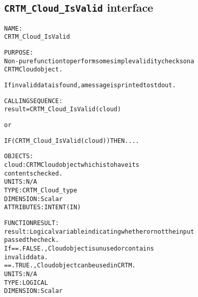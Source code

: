 \subsection{\texttt{CRTM\_Cloud\_IsValid} interface}
  \label{sec:CRTM_Cloud_IsValid_interface}
  \begin{alltt}
 
  NAME:
        CRTM_Cloud_IsValid
 
  PURPOSE:
        Non-pure function to perform some simple validity checks on a
        CRTM Cloud object.
 
        If invalid data is found, a message is printed to stdout.
 
  CALLING SEQUENCE:
        result = CRTM_Cloud_IsValid( cloud )
 
          or
 
        IF ( CRTM_Cloud_IsValid( cloud ) ) THEN....
 
  OBJECTS:
        cloud:         CRTM Cloud object which is to have its
                       contents checked.
                       UNITS:      N/A
                       TYPE:       CRTM_Cloud_type
                       DIMENSION:  Scalar
                       ATTRIBUTES: INTENT(IN)
 
  FUNCTION RESULT:
        result:        Logical variable indicating whether or not the input
                       passed the check.
                       If == .FALSE., Cloud object is unused or contains
                                      invalid data.
                          == .TRUE.,  Cloud object can be used in CRTM.
                       UNITS:      N/A
                       TYPE:       LOGICAL
                       DIMENSION:  Scalar
 
  \end{alltt}
